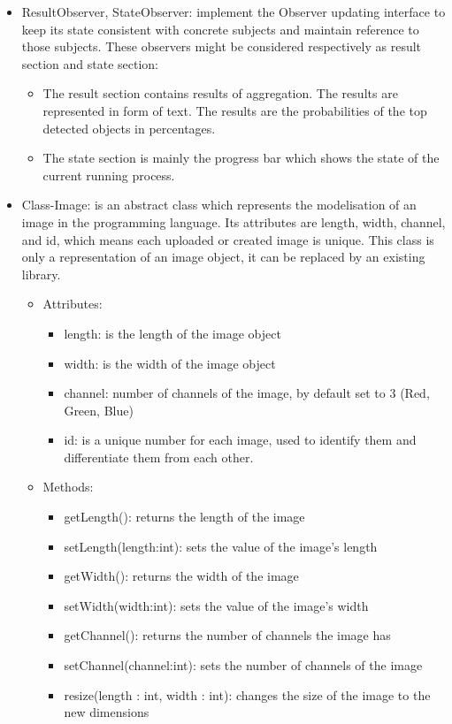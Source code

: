 \documentclass[parskip=full]{scrartcl}
\begin{document}
\pagebreak



\begin{itemize}
	\item ResultObserver, StateObserver: implement the Observer updating interface to keep its state consistent with concrete subjects and maintain reference to those subjects. These observers might be considered respectively as result section and state section:
	\begin{itemize}
		\item The result section contains results of aggregation. The results are represented in form of text. The results are the probabilities of the top detected objects in percentages.
		\item The state section is mainly the progress bar which shows the state of the current running process.
	\end{itemize}
	\item Class-Image: is an abstract class which represents the modelisation of an image in the programming language. Its attributes are length, width, channel, and id, which means each uploaded or created image is unique. This class is only a representation of an image object, it can be replaced by an existing library.
	\begin{itemize}
		\item Attributes:
		\begin{itemize}
			\item length: is the length of the image object
			\item width: is the width of the image object
			\item channel: number of channels of the image, by default set to 3 (Red, Green, Blue)
			\item id: is a unique number for each image, used to identify them and differentiate them from each other.
		\end{itemize}
		\item Methods:
		\begin{itemize}
			\item getLength(): returns the length of the image	
			\item setLength(length:int): sets the value of the image's length	
			\item getWidth(): returns the width of the image
			\item setWidth(width:int): sets the value of the image's width
			\item getChannel(): returns the number of channels the image has
			\item setChannel(channel:int): sets the number of channels of the image
			\item resize(length : int, width : int): changes the size of the image to the new dimensions
		\end{itemize}
	\end{itemize}
\end{itemize}
\end{document}
